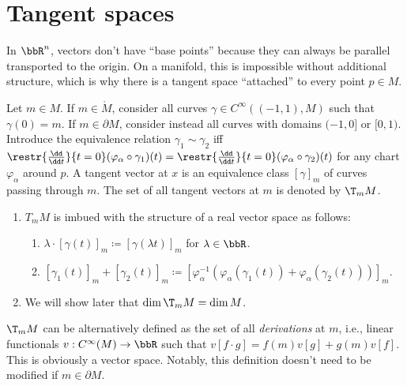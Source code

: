 \section{Tangent spaces}
    In $\bbR^n$, vectors don't have ``base points'' because they can always be parallel transported to the origin. On a manifold, this is impossible without additional structure, which is why there is a tangent space ``attached'' to every point $p\in M$. 
\begin{defn}
    Let $m\in M$. If $m\in \mathring M$, consider all curves $\gamma\in C^\infty((-1,1),M)$ such that $\gamma(0)=m$. If $m\in \partial M$, consider instead all curves with domains $(-1,0]$ or $[0,1)$. Introduce the equivalence relation $\gamma_1\sim \gamma_2$  iff $\restr{\frac{\dd}{\dd t}}{t=0}(\varphi_\alpha\circ \gamma_1)(t)=\restr{\frac{\dd}{\dd t}}{t=0}(\varphi_\alpha\circ \gamma_2)(t)$ for any chart $\varphi_\alpha$ around $p$. A tangent vector at $x$ is an equivalence class $[\gamma]_m$ of curves passing through $m$. The set of all tangent vectors at $m$ is denoted by $\T_m M$.
\end{defn}

\begin{enumerate}
    \item $T_m M$ is imbued with the structure of a real vector space as follows:
    \begin{enumerate}
        \item $\lambda\cdot [\gamma(t)]_m\coloneqq [\gamma(\lambda t)]_m$ for $\lambda\in\bbR $.
        \item $[\gamma_1(t)]_m+[\gamma_2(t)]_m\coloneqq [\varphi_\alpha^{-1}(\varphi_\alpha(\gamma_1(t))+\varphi_\alpha(\gamma_2(t)))]_m.$
    \end{enumerate}
    \item We will show later that $\dim \T_m  M=\dim M$.
\end{enumerate}


\begin{defn}
    $\T_m  M$ can be alternatively defined as the set of all \emph{derivations} at $m$, i.e., linear functionals $v:C^\infty(M)\to \bbR $ such that $v[f\cdot g]=f(m)v[g]+g(m)v[f]$. This is obviously a vector space. Notably, this definition doesn't need to be modified if $m\in\partial M$.
\end{defn}

